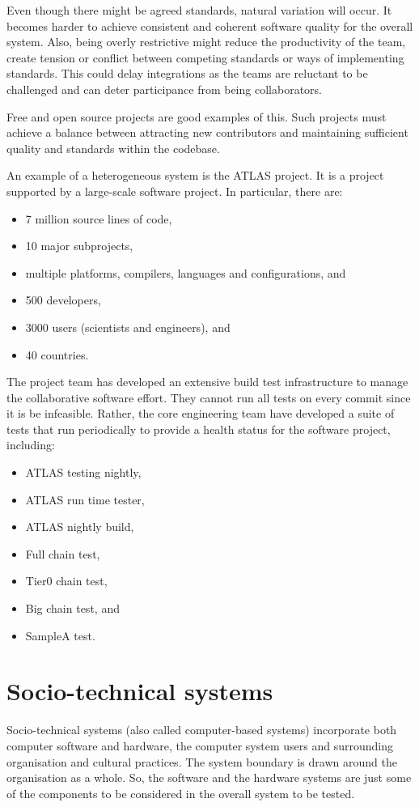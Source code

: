 \documentclass[a4paper, openany]{memoir}
\begin{document}
Even though there might be agreed standards, natural variation will occur. It becomes harder to achieve consistent and coherent software quality for the overall system. Also, being overly restrictive might reduce the productivity of the team, create tension or conflict between competing standards or ways of implementing standards. This could delay integrations as the teams are reluctant to be challenged and can deter participance from being collaborators.

Free and open source projects are good examples of this. Such projects must achieve a balance between attracting new contributors and maintaining sufficient quality and standards within the codebase.

An example of a heterogeneous system is the ATLAS project. It is a project supported by a large-scale software project. In particular, there are:
\begin{itemize}
    \item 7 million source lines of code,
    \item 10 major subprojects,
    \item multiple platforms, compilers, languages and configurations, and
    \item 500 developers,
    \item 3000 users (scientists and engineers), and
    \item 40 countries.
\end{itemize}

The project team has developed an extensive build test infrastructure to manage the collaborative software effort. They cannot run all tests on every commit since it is be infeasible. Rather, the core engineering team have developed a suite of tests that run periodically to provide a health status for the software project, including:
\begin{itemize}
    \item ATLAS testing nightly,
    \item ATLAS run time tester,
    \item ATLAS nightly build,
    \item Full chain test,
    \item Tier0 chain test,
    \item Big chain test, and
    \item SampleA test.
\end{itemize}

\section{Socio-technical systems}
Socio-technical systems (also called computer-based systems) incorporate both computer software and hardware, the computer system users and surrounding organisation and cultural practices. The system boundary is drawn around the organisation as a whole. So, the software and the hardware systems are just some of the components to be considered in the overall system to be tested. 
\end{document}
